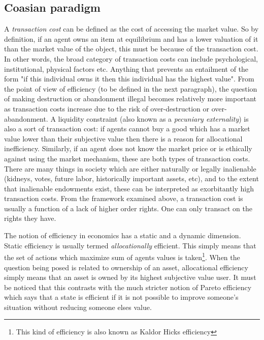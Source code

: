 \subsection{Coasian paradigm}\label{coase}

A \textit{transaction cost} can be defined as the cost of accessing the market value. So by definition, if an agent owns an item at equilibrium and has a lower valuation of it than the market value of the object, this must be because of the transaction cost. In other words, the broad category of transaction costs can include psychological, institutional, physical factors etc. Anything that prevents an entailment of the form "if this individual owns it then this individual has the highest value". From the point of view of efficiency (to be defined in the next paragraph), the question of making destruction or abandonment illegal becomes relatively more important as transaction costs increase due to the risk of over-destruction or over-abandonment. A liquidity constraint (also known as a \textit{pecuniary externality}) is also a sort of transaction cost: if agents cannot buy a good which has a market value lower than their subjective value then there is a reason for allocational inefficiency. Similarly, if an agent does not know the market price or is ethically against using the market mechanism, these are both types of transaction costs. There are many things in society which are either naturally or legally inalienable (kidneys, votes, future labor, historically important assets, etc), and to the extent that inalienable endowments exist, these can be interpreted as exorbitantly high transaction costs. From the framework examined above, a transaction cost is usually a function of a lack of higher order rights. One can only transact on the rights they have.

The notion of efficiency in economics has a static and a dynamic dimension. Static efficiency is usually termed \textit{allocationally} efficient. This simply means that the set of actions which maximize sum of agents values is taken\footnote{This kind of efficiency is also known as Kaldor Hicks efficiency}. When the question being posed is related to ownership of an asset, allocational efficiency simply means that an asset is owned by its highest subjective value user. It must be noticed that this contrasts with the much stricter notion of Pareto efficiency which says that a state is efficient if it is not possible to improve someone's situation without reducing someone elses value. 

